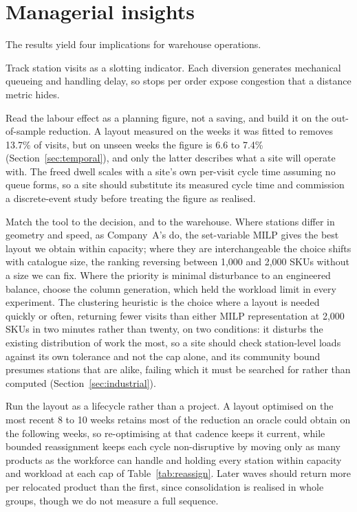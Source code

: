 \documentclass[]{interact}
\begin{document}
\section{Managerial insights}\label{sec:managerial}
The results yield four implications for warehouse operations.

Track station visits as a slotting indicator. Each diversion generates mechanical queueing and handling delay, so stops per order expose congestion that a distance metric hides.

Read the labour effect as a planning figure, not a saving, and build it on the out-of-sample reduction. A layout measured on the weeks it was fitted to removes 13.7\% of visits, but on unseen weeks the figure is 6.6 to 7.4\% (Section~\ref{sec:temporal}), and only the latter describes what a site will operate with. The freed dwell scales with a site's own per-visit cycle time assuming no queue forms, so a site should substitute its measured cycle time and commission a discrete-event study before treating the figure as realised.

Match the tool to the decision, and to the warehouse. Where stations differ in geometry and speed, as Company~A's do, the set-variable MILP gives the best layout we obtain within capacity; where they are interchangeable the choice shifts with catalogue size, the ranking reversing between 1,000 and 2,000 SKUs without a size we can fix. Where the priority is minimal disturbance to an engineered balance, choose the column generation, which held the workload limit in every experiment. The clustering heuristic is the choice where a layout is needed quickly or often, returning fewer visits than either MILP representation at 2,000 SKUs in two minutes rather than twenty, on two conditions: it disturbs the existing distribution of work the most, so a site should check station-level loads against its own tolerance and not the cap alone, and its community bound presumes stations that are alike, failing which it must be searched for rather than computed (Section~\ref{sec:industrial}).

Run the layout as a lifecycle rather than a project. A layout optimised on the most recent 8 to 10 weeks retains most of the reduction an oracle could obtain on the following weeks, so re-optimising at that cadence keeps it current, while bounded reassignment keeps each cycle non-disruptive by moving only as many products as the workforce can handle and holding every station within capacity and workload at each cap of Table~\ref{tab:reassign}. Later waves should return more per relocated product than the first, since consolidation is realised in whole groups, though we do not measure a full sequence.
\end{document}
